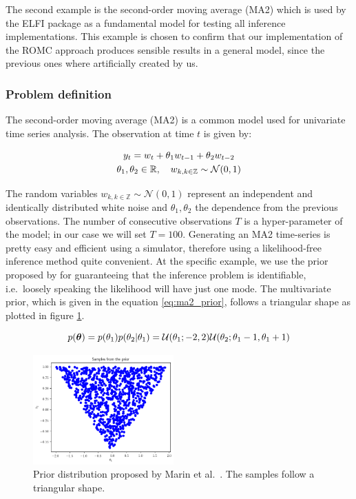 The second example is the second-order moving average (MA2) which is
used by the ELFI package as a fundamental model for testing all
inference implementations. This example is chosen to confirm that our
implementation of the ROMC approach produces sensible results in a
general model, since the previous ones where artificially created by
us.

\subsubsection*{Problem definition}

The second-order moving average (MA2) is a common model used for
univariate time series analysis. The observation at time $t$ is given by:

\begin{gather} \label{eq:ma2}
y_t = w_t + \theta_1 w_{t-1} + \theta_2 w_{t-2}\\
\theta_1, \theta_2 \in \mathbb{R}, \quad  w_{k, k \in \mathbb{Z}} \sim \mathcal{N}(0,1)
\end{gather}

\noindent
The random variables $w_{k, k \in \mathbb{Z}} \sim \mathcal{N}(0,1)$
represent an independent and identically distributed white noise and
$\theta_1, \theta_2$ the dependence from the previous
observations. The number of consecutive observations $T$ is a
hyper-parameter of the model; in our case we will set
$T=100$. Generating an MA2 time-series is pretty easy and efficient
using a simulator, therefore using a likelihood-free inference method
quite convenient. At the specific example, we use the prior proposed
by \autocite{Marin2012} for guaranteeing that the inference problem is
identifiable, i.e.\ loosely speaking the likelihood will have just one
mode. The multivariate prior, which is given in the equation
\eqref{eq:ma2_prior}, follows a triangular shape as plotted in figure
\ref{fig:ma2_1}.

\begin{equation} \label{eq:ma2_prior}
p(\boldsymbol{\theta}) = p(\theta_1)p(\theta_2|\theta_1)
= \mathcal{U}(\theta_1;-2,2)\mathcal{U}(\theta_2;\theta_1-1, \theta_1+1)
\end{equation}

\begin{figure}[h]
    \begin{center}
      \includegraphics[width=0.48\textwidth]{./Thesis/images/chapter4/mae2_prior_samples.png}
    \end{center}
    \caption{Prior distribution proposed by Marin et al.\
      \cite{Marin2012}. The samples follow a triangular shape.}
  \label{fig:ma2_1}
\end{figure}

